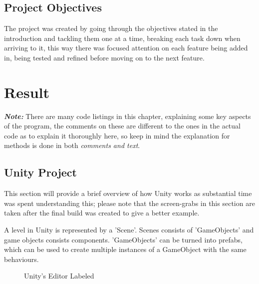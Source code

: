 \documentclass[11pt]{report}
\begin{document}
\section{Project Objectives}
The project was created by going through the objectives stated in the introduction and tackling them one at a time, breaking each task down when arriving to it, this way there was focused attention on each feature being added in, being tested and refined before moving on to the next feature.

\chapter{Result}

\textit{\textbf{Note:}} There are many code listings in this chapter, explaining some key aspects of the program, the comments on these are different to the ones in the actual code as to explain it thoroughly here, so keep in mind the explanation for methods is done in both \textit{comments and text}.

\section{Unity Project}

This section will provide a brief overview of how Unity works as substantial time was spent understanding this; please note that the screen-grabs in this section are taken after the final build was created to give a better example.

A level in Unity is represented by a 'Scene'. Scenes consists of 'GameObjects' and game objects consists components. 'GameObjects' can be turned into prefabs, which can be used to create multiple instances of a GameObject with the same behaviours.

\begin{figure}[H]
    \centering
    \caption{Unity's Editor Labeled}
\end{figure}
\end{document}

